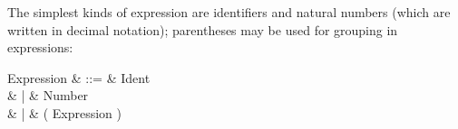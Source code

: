 \new The simplest kinds of expression are
identifiers and natural numbers
(which are written in decimal notation);
parentheses may be used for
grouping in expressions:
\begin{syntax}
        Expression
                & ::= & Ident \\
                &  |  & Number \\
                &  |  & ( Expression )
\end{syntax}
